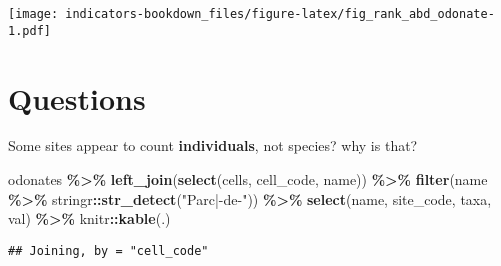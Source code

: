 \documentclass[
]{book}
\newenvironment{Shaded}{\begin{snugshade}}{\end{snugshade}}
\newcommand{\KeywordTok}[1]{\textcolor[rgb]{0.13,0.29,0.53}{\textbf{#1}}}
\newcommand{\NormalTok}[1]{#1}
\newcommand{\OperatorTok}[1]{\textcolor[rgb]{0.81,0.36,0.00}{\textbf{#1}}}
\newcommand{\StringTok}[1]{\textcolor[rgb]{0.31,0.60,0.02}{#1}}
\begin{document}
\texttt{[image: indicators-bookdown\_files/figure-latex/fig\_rank\_abd\_odonate-1.pdf]}

\hypertarget{questions}{%
\section{Questions}\label{questions}}

Some sites appear to count \textbf{individuals}, not species? why is that?

\begin{Shaded}
\begin{Highlighting}[]
\NormalTok{odonates }\OperatorTok{\%\textgreater{}\%}\StringTok{ }
\StringTok{  }\KeywordTok{left\_join}\NormalTok{(}\KeywordTok{select}\NormalTok{(cells, cell\_code, name)) }\OperatorTok{\%\textgreater{}\%}\StringTok{ }
\StringTok{  }\KeywordTok{filter}\NormalTok{(name }\OperatorTok{\%\textgreater{}\%}\StringTok{ }\NormalTok{stringr}\OperatorTok{::}\KeywordTok{str\_detect}\NormalTok{(}\StringTok{"Parc|{-}de{-}"}\NormalTok{)) }\OperatorTok{\%\textgreater{}\%}\StringTok{ }
\StringTok{  }\KeywordTok{select}\NormalTok{(name, site\_code, taxa, val) }\OperatorTok{\%\textgreater{}\%}\StringTok{ }\NormalTok{knitr}\OperatorTok{::}\KeywordTok{kable}\NormalTok{(.)}
\end{Highlighting}
\end{Shaded}

\begin{verbatim}
## Joining, by = "cell_code"
\end{verbatim}
\end{document}

